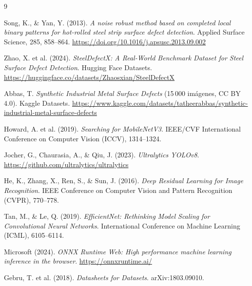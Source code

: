 \documentclass[11pt,a4paper]{article}
\begin{document}
\begin{thebibliography}{9}\small

Song, K., \& Yan, Y. (2013).
\emph{A noise robust method based on completed local binary patterns for
hot-rolled steel strip surface defect detection}.
Applied Surface Science, 285, 858--864.
\url{https://doi.org/10.1016/j.apsusc.2013.09.002}

Zhao, X. et al. (2024).
\emph{SteelDefectX: A Real-World Benchmark Dataset for Steel Surface Defect
Detection}. Hugging Face Datasets.
\url{https://huggingface.co/datasets/Zhaosxian/SteelDefectX}

Abbas, T.
\emph{Synthetic Industrial Metal Surface Defects} (15\,000 imágenes, CC BY 4.0).
Kaggle Datasets.
\url{https://www.kaggle.com/datasets/tatheerabbas/synthetic-industrial-metal-surface-defects}

Howard, A. et al. (2019).
\emph{Searching for MobileNetV3}.
IEEE/CVF International Conference on Computer Vision (ICCV), 1314--1324.

Jocher, G., Chaurasia, A., \& Qiu, J. (2023).
\emph{Ultralytics YOLOv8}.
\url{https://github.com/ultralytics/ultralytics}

He, K., Zhang, X., Ren, S., \& Sun, J. (2016).
\emph{Deep Residual Learning for Image Recognition}.
IEEE Conference on Computer Vision and Pattern Recognition (CVPR), 770--778.

Tan, M., \& Le, Q. (2019).
\emph{EfficientNet: Rethinking Model Scaling for Convolutional Neural Networks}.
International Conference on Machine Learning (ICML), 6105--6114.

Microsoft (2024).
\emph{ONNX Runtime Web: High performance machine learning inference in the browser}.
\url{https://onnxruntime.ai/}

Gebru, T. et al. (2018).
\emph{Datasheets for Datasets}.
arXiv:1803.09010.

\end{thebibliography}
\end{document}
